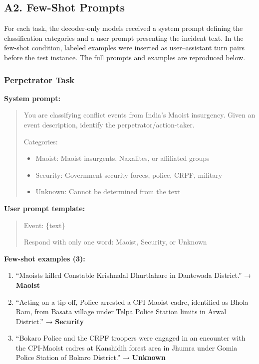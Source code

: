 \documentclass[
  11pt,
]{article}
\providecommand{\tightlist}{%
  \setlength{\itemsep}{0pt}\setlength{\parskip}{0pt}}
\begin{document}
\newpage

\subsection{A2. Few-Shot Prompts}\label{sec-prompts}

For each task, the decoder-only models received a system prompt defining
the classification categories and a user prompt presenting the incident
text. In the few-shot condition, labeled examples were inserted as
user--assistant turn pairs before the test instance. The full prompts
and examples are reproduced below.

\subsubsection{Perpetrator Task}\label{perpetrator-task-1}

\textbf{System prompt:}

\begin{quote}
You are classifying conflict events from India's Maoist insurgency.
Given an event description, identify the perpetrator/action-taker.

Categories:

\begin{itemize}
\tightlist
\item
  Maoist: Maoist insurgents, Naxalites, or affiliated groups
\item
  Security: Government security forces, police, CRPF, military
\item
  Unknown: Cannot be determined from the text
\end{itemize}
\end{quote}

\textbf{User prompt template:}

\begin{quote}
Event: \{text\}

Respond with only one word: Maoist, Security, or Unknown
\end{quote}

\textbf{Few-shot examples (3):}

\begin{enumerate}
\def\labelenumi{\arabic{enumi}.}
\tightlist
\item
  ``Maoists killed Constable Krishnalal Dhurtlahare in Dantewada
  District.'' → \textbf{Maoist}
\item
  ``Acting on a tip off, Police arrested a CPI-Maoist cadre, identified
  as Bhola Ram, from Basata village under Telpa Police Station limits in
  Arwal District.'' → \textbf{Security}
\item
  ``Bokaro Police and the CRPF troopers were engaged in an encounter
  with the CPI-Maoist cadres at Kanshidih forest area in Jhumra under
  Gomia Police Station of Bokaro District.'' → \textbf{Unknown}
\end{enumerate}
\end{document}
